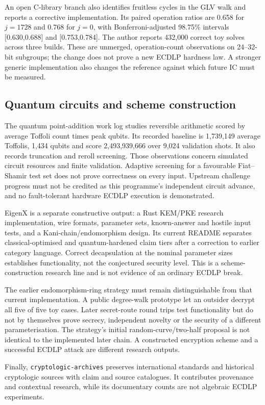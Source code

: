 An open C-library branch also identifies fruitless cycles in the GLV
walk and reports a corrective implementation. Its paired operation
ratios are 0.658 for $j=1728$ and 0.768 for $j=0$, with Bonferroni-adjusted
98.75\% intervals [0.630,0.688] and [0.753,0.784]. The author reports
432,000 correct toy solves across three builds. These are unmerged,
operation-count observations on 24--32-bit subgroups; the change does
not prove a new ECDLP hardness law. A stronger generic implementation
also changes the reference against which future IC must be measured.

\subsection{Quantum circuits and scheme construction}

The quantum point-addition work log studies reversible arithmetic scored
by average Toffoli count times peak qubits. Its recorded baseline is
1,739,149 average Toffolis, 1,434 qubits and score 2,493,939,666 over
9,024 validation shots. It also records truncation and reroll screening.
Those observations concern simulated circuit resources and finite
validation. Adaptive screening for a favourable Fiat--Shamir test set
does not prove correctness on every input. Upstream challenge progress
must not be credited as this programme's independent circuit advance,
and no fault-tolerant hardware ECDLP execution is demonstrated.

EigenX is a separate constructive output: a Rust KEM/PKE research
implementation, wire formats, parameter sets, known-answer and hostile
input tests, and a Kani-chain/endomorphism design. Its current README
separates classical-optimised and quantum-hardened claim tiers after a
correction to earlier category language. Correct decapsulation at the
nominal parameter sizes establishes functionality, not the conjectured
security level. This is a scheme-construction research line and is not
evidence of an ordinary ECDLP break.

The earlier endomorphism-ring strategy must remain distinguishable from
that current implementation. A public degree-walk prototype let an
outsider decrypt all five of five toy cases. Later secret-route round
trips test functionality but do not by themselves prove secrecy,
independent novelty or the security of a different parameterisation.
The strategy's initial random-curve/two-half proposal is not identical
to the implemented later chain. A constructed encryption scheme and a
successful ECDLP attack are different research outputs.

Finally, \texttt{cryptologic-archives} preserves international standards
and historical cryptologic sources with claim and source catalogues.
It contributes provenance and contextual research, while its documentary
counts are not algebraic ECDLP experiments.
